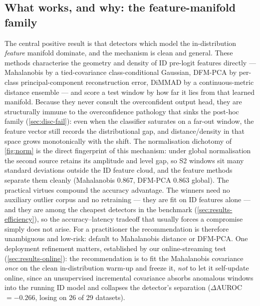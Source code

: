 \subsection{What works, and why: the feature-manifold family}\label{sec:disc-why}
The central positive result is that detectors which model the in-distribution
\emph{feature} manifold dominate, and the mechanism is clean and general. These
methods characterise the geometry and density of ID pre-logit features directly ---
Mahalanobis by a tied-covariance class-conditional Gaussian, DFM-PCA by
per-class principal-component reconstruction error, DiMMAD by a continuous-metric
distance ensemble --- and score a test window by how far it lies from that learned
manifold. Because they never consult the overconfident output head, they are
structurally immune to the overconfidence pathology that sinks the post-hoc family
(\cref{sec:disc-fail}): even when the classifier saturates on a far-out window, the
feature vector still records the distributional gap, and distance/density in that
space grows monotonically with the shift. The normalisation dichotomy of
\cref{fig:norm} is the direct fingerprint of this mechanism: under global
normalisation the second source retains its amplitude and level gap, so S2 windows
sit many standard deviations outside the ID feature cloud, and the feature methods
separate them cleanly (Mahalanobis \num{0.867}, DFM-PCA \num{0.863} global). The
practical virtues compound the accuracy advantage. The winners need no auxiliary
outlier corpus and no retraining --- they are fit on ID features alone --- and they
are among the cheapest detectors in the benchmark (\cref{sec:results-efficiency}),
so the accuracy--latency tradeoff that usually forces a compromise simply does not
arise. For a practitioner the recommendation is therefore unambiguous and
low-risk: default to Mahalanobis distance or DFM-PCA. One deployment refinement
matters, established by our online-streaming test (\cref{sec:results-online}): the
recommendation is to fit the Mahalanobis covariance \emph{once} on the clean
in-distribution warm-up and freeze it, \emph{not} to let it self-update online,
since an unsupervised incremental covariance absorbs anomalous windows into the
running ID model and collapses the detector's separation ($\Delta$AUROC
$=\num{-0.266}$, losing on \num{26} of \num{29} datasets).

